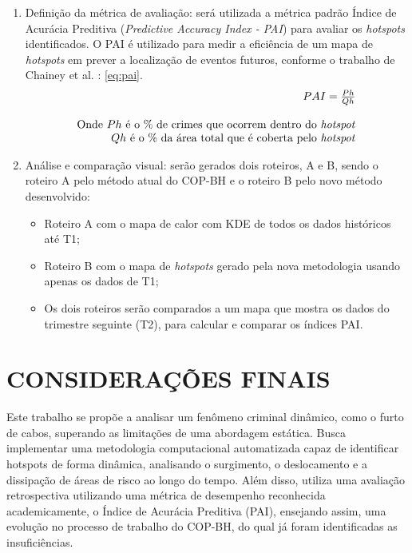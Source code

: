 \begin{enumerate}
  \item{Definição da métrica de avaliação: será utilizada a métrica padrão Índice de Acurácia Preditiva (\textit{Predictive Accuracy Index - PAI}) para avaliar os \textit{hotspots} identificados. O PAI é utilizado para medir a eficiência de um mapa de \textit{hotspots} em prever a localização de eventos futuros, conforme o trabalho de Chainey et al. \cite{Chainey2008}: \ref{eq:pai}.\\  }
  \begin{equation} \label{eq:pai}
    \begin{array}{rcl}
      PAI = \frac{Ph}{Qh} \\ \\
      \text{Onde } Ph \text{ é o \% de crimes que ocorrem dentro do \textit{hotspot}} \\
      Qh \text{ é o \% da área total que é coberta pelo \textit{hotspot}} \\
    \end{array}
  \end{equation}
  \item{Análise e comparação visual: serão gerados dois roteiros, A e B, sendo o roteiro A pelo método atual do COP-BH e o roteiro B pelo novo método desenvolvido:}
  \begin{itemize}
    \item{Roteiro A com o mapa de calor com KDE de todos os dados históricos até T1;}
    \item{Roteiro B com o mapa de \textit{hotspots} gerado pela nova metodologia usando apenas os dados de T1;}
    \item{Os dois roteiros serão comparados a um mapa que mostra os dados do trimestre seguinte (T2), para calcular e comparar os índices PAI.}
  \end{itemize}
\end{enumerate}

\section{CONSIDERAÇÕES FINAIS} %
\label{sec:conclusao}
Este trabalho se propõe a  analisar um fenômeno criminal dinâmico, como o furto de cabos, superando as limitações de uma abordagem estática. Busca implementar uma metodologia computacional automatizada capaz de identificar hotspots de forma dinâmica, analisando o surgimento, o deslocamento e a dissipação de áreas de risco ao longo do tempo. Além disso, utiliza uma avaliação retrospectiva utilizando uma métrica de desempenho reconhecida academicamente, o Índice de Acurácia Preditiva (PAI), ensejando assim, uma evolução no processo de trabalho do COP-BH, do qual já foram identificadas as insuficiências.

